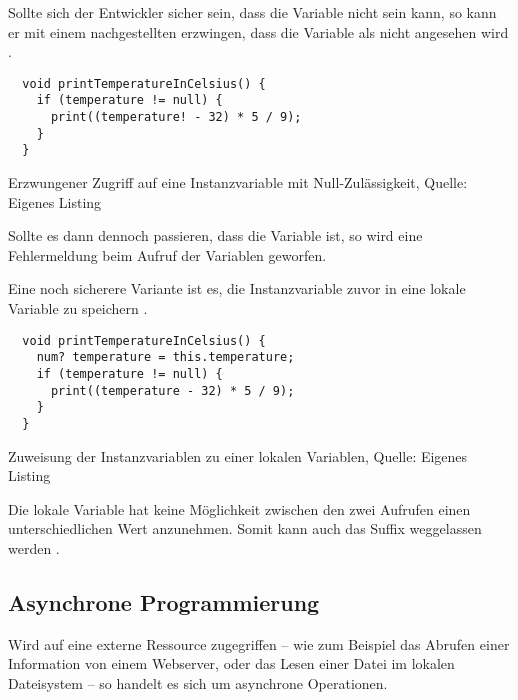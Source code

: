 Sollte sich der Entwickler sicher sein, dass die Variable nicht  sein kann, so kann er mit einem nachgestellten \IC{!} erzwingen, dass die Variable als nicht  angesehen wird .

\ifIncludeFigures
  \begin{listing}[ht]
    \begin{verbatim}
  void printTemperatureInCelsius() {
    if (temperature != null) {
      print((temperature! - 32) * 5 / 9);
    }
  }
    \end{verbatim}
    \caption[Erzwungener Zugriff auf eine Instanzvariable mit Null-Zulässigkeit]{Erzwungener Zugriff auf eine Instanzvariable mit Null-Zulässigkeit, Quelle: Eigenes Listing}
    \label{lst:printTemperatureInCelsiusLocalVariableForceNullCheck}
  \end{listing}
\fi

Sollte es dann dennoch passieren, dass die Variable  ist, so wird eine Fehlermeldung beim Aufruf der Variablen geworfen.



Eine noch sicherere Variante ist es, die Instanzvariable zuvor in eine lokale Variable zu speichern .


\ifIncludeFigures
  \begin{listing}[ht]
    \begin{verbatim}
  void printTemperatureInCelsius() {
    num? temperature = this.temperature;
    if (temperature != null) {
      print((temperature - 32) * 5 / 9);
    }
  }
    \end{verbatim}
    \caption[Zuweisung der Instanzvariablen zu einer lokalen Variablen]{Zuweisung der Instanzvariablen zu einer lokalen Variablen, Quelle: Eigenes Listing}
    \label{lst:printTemperatureInCelsiusLocalVariable}
  \end{listing}
\fi

Die lokale Variable hat keine Möglichkeit zwischen den zwei Aufrufen einen unterschiedlichen Wert anzunehmen.
Somit kann auch das Suffix \IC{!} weggelassen werden .



\subsection{Asynchrone Programmierung}

Wird auf eine externe Ressource zugegriffen -- wie zum Beispiel das Abrufen einer Information von einem Webserver, oder das Lesen einer Datei im lokalen Dateisystem -- so handelt es sich um asynchrone Operationen.

